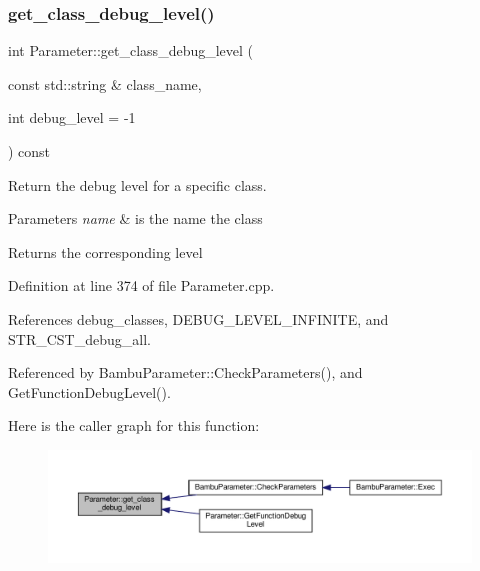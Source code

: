 \mbox{\label{classParameter_aa5100b323f753f5e640716d9e0b77f44}} 
\subsubsection{\texorpdfstring{get\+\_\+class\+\_\+debug\+\_\+level()}{get\_class\_debug\_level()}}
{\footnotesize\ttfamily int Parameter\+::get\+\_\+class\+\_\+debug\+\_\+level (\begin{DoxyParamCaption}\item[{const std\+::string \&}]{class\+\_\+name,  }\item[{int}]{debug\+\_\+level = {\ttfamily -\/1} }\end{DoxyParamCaption}) const}



Return the debug level for a specific class. 


\begin{DoxyParams}{Parameters}
{\em name} & is the name the class \\
\hline
\end{DoxyParams}
\begin{DoxyReturn}{Returns}
the corresponding level 
\end{DoxyReturn}


Definition at line 374 of file Parameter.\+cpp.



References debug\+\_\+classes, D\+E\+B\+U\+G\+\_\+\+L\+E\+V\+E\+L\+\_\+\+I\+N\+F\+I\+N\+I\+TE, and S\+T\+R\+\_\+\+C\+S\+T\+\_\+debug\+\_\+all.



Referenced by Bambu\+Parameter\+::\+Check\+Parameters(), and Get\+Function\+Debug\+Level().

Here is the caller graph for this function\+:
\nopagebreak
\begin{figure}[H]
\begin{center}
\leavevmode
\includegraphics[width=350pt]{dc/dab/classParameter_aa5100b323f753f5e640716d9e0b77f44_icgraph}
\end{center}
\end{figure}
\mbox{\label{classParameter_aee7d58cc4376bd4d41fc634bddb459a3}} 
